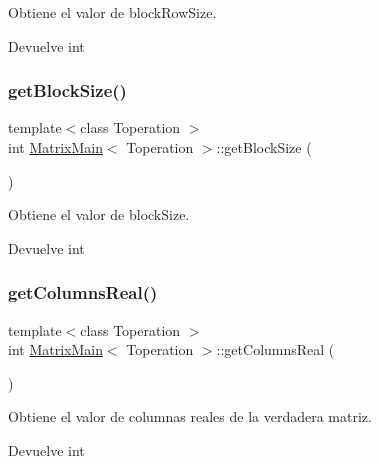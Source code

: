 Obtiene el valor de block\+Row\+Size. 

\begin{DoxyReturn}{Devuelve}
int 
\end{DoxyReturn}
\mbox{\label{classMatrixMain_aa838ad93f6915c9425de28416cfd28af}} 
\subsubsection{\texorpdfstring{get\+Block\+Size()}{getBlockSize()}}
{\footnotesize\ttfamily template$<$class Toperation $>$ \\
int \hyperlink{classMatrixMain}{Matrix\+Main}$<$ Toperation $>$\+::get\+Block\+Size (\begin{DoxyParamCaption}{ }\end{DoxyParamCaption})}



Obtiene el valor de block\+Size. 

\begin{DoxyReturn}{Devuelve}
int 
\end{DoxyReturn}
\mbox{\label{classMatrixMain_aae0f90b2eaf866d16b3e3ade9170dab4}} 
\subsubsection{\texorpdfstring{get\+Columns\+Real()}{getColumnsReal()}}
{\footnotesize\ttfamily template$<$class Toperation $>$ \\
int \hyperlink{classMatrixMain}{Matrix\+Main}$<$ Toperation $>$\+::get\+Columns\+Real (\begin{DoxyParamCaption}{ }\end{DoxyParamCaption})}



Obtiene el valor de columnas reales de la verdadera matriz. 

\begin{DoxyReturn}{Devuelve}
int 
\end{DoxyReturn}
\mbox{\label{classMatrixMain_a82b10c2d369328d9254fdc7a435f173f}} 
